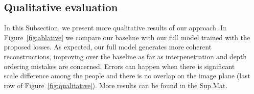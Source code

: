 \subsection{Qualitative evaluation} \label{sec:qualitative}
In this Subsection, we present more qualitative results of our approach. In Figure~\ref{fig:ablative} we compare our baseline with our full model trained with the proposed losses. As expected, our full model generates more coherent reconstructions, improving over the baseline as far as interpenetration and depth ordering mistakes are concerned. Errors can happen when there is significant scale difference among the people and there is no overlap on the image plane (last row of Figure~\ref{fig:qualitative}). More results can be found in the Sup.Mat.